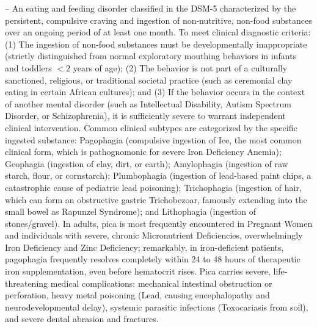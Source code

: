 -- An eating and feeding disorder classified in the DSM-5 characterized by the persistent, compulsive craving and ingestion of non-nutritive, non-food substances over an ongoing period of at least one month. To meet clinical diagnostic criteria: (1) The ingestion of non-food substances must be developmentally inappropriate (strictly distinguished from normal exploratory mouthing behaviors in infants and toddlers $<2$ years of age); (2) The behavior is not part of a culturally sanctioned, religious, or traditional societal practice (such as ceremonial clay eating in certain African cultures); and (3) If the behavior occurs in the context of another mental disorder (such as Intellectual Disability, Autism Spectrum Disorder, or Schizophrenia), it is sufficiently severe to warrant independent clinical intervention. Common clinical subtypes are categorized by the specific ingested substance: Pagophagia (compulsive ingestion of Ice, the most common clinical form, which is pathognomonic for severe Iron Deficiency Anemia); Geophagia (ingestion of clay, dirt, or earth); Amylophagia (ingestion of raw starch, flour, or cornstarch); Plumbophagia (ingestion of lead-based paint chips, a catastrophic cause of pediatric lead poisoning); Trichophagia (ingestion of hair, which can form an obstructive gastric Trichobezoar, famously extending into the small bowel as Rapunzel Syndrome); and Lithophagia (ingestion of stones/gravel). In adults, pica is most frequently encountered in Pregnant Women and individuals with severe, chronic Micronutrient Deficiencies, overwhelmingly Iron Deficiency and Zinc Deficiency; remarkably, in iron-deficient patients, pagophagia frequently resolves completely within 24 to 48 hours of therapeutic iron supplementation, even before hematocrit rises. Pica carries severe, life-threatening medical complications: mechanical intestinal obstruction or perforation, heavy metal poisoning (Lead, causing encephalopathy and neurodevelopmental delay), systemic parasitic infections (Toxocariasis from soil), and severe dental abrasion and fractures.

